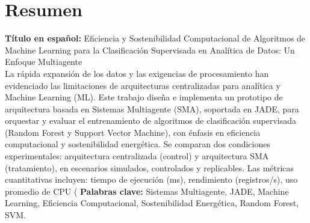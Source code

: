 \documentclass[12pt,oneside]{report}
\newcommand{\ThesisTitle}{Eficiencia y Sostenibilidad Computacional de Algoritmos de Machine Learning para la Clasificación Supervisada en Analítica de Datos: Un Enfoque Multiagente}
\begin{document}
\chapter*{Resumen}
\textbf{Título en español:} \ThesisTitle\\[0.2cm]
La rápida expansión de los datos y las exigencias de procesamiento han evidenciado las limitaciones de arquitecturas centralizadas para analítica y Machine Learning (ML). Este trabajo diseña e implementa un prototipo de arquitectura basada en Sistemas Multiagente (SMA), soportada en JADE, para orquestar y evaluar el entrenamiento de algoritmos de clasificación supervisada (Random Forest y Support Vector Machine), con énfasis en eficiencia computacional y sostenibilidad energética. Se comparan dos condiciones experimentales: arquitectura centralizada (control) y arquitectura SMA (tratamiento), en escenarios simulados, controlados y replicables. Las métricas cuantitativas incluyen: tiempo de ejecución (ms), rendimiento (registros/s), uso promedio de CPU (%
\textbf{Palabras clave:} Sistemas Multiagente, JADE, Machine Learning, Eficiencia Computacional, Sostenibilidad Energética, Random Forest, SVM.
\end{document}
